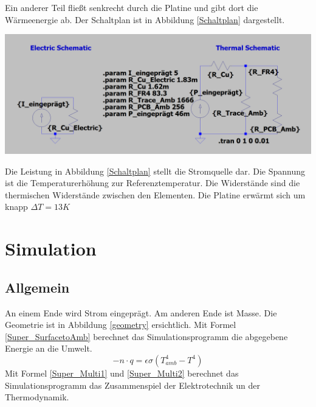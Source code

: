 \documentclass[10pt,a4paper,oneside,abstracton]{scrartcl}
\newenvironment{Figure}
  {\par\medskip\noindent\minipage{\linewidth}}
  {\endminipage\par\medskip}
\begin{document}
\begin{multicols}{2}
\newline
Ein anderer Teil fließt senkrecht durch die Platine und gibt dort die Wärmeenergie ab. 
Der Schaltplan ist in Abbildung \ref*{Schaltplan} dargestellt. 
\begin{Figure}
	\includegraphics[width=\textwidth]{Bilder/Schaltplan.png}
	\label{Schaltplan}
\end{Figure}
\noindent
Die Leistung in Abbildung \ref{Schaltplan} stellt die Stromquelle dar. 
Die Spannung ist die Temperaturerhöhung zur Referenztemperatur. 
Die Widerstände sind die thermischen Widerstände zwischen den Elementen. 
\newline
Die Platine erwärmt sich um knapp $\Delta T = 13K$


\section{Simulation}
\subsection{Allgemein}
An einem Ende wird Strom eingeprägt. Am anderen Ende ist Masse.
Die Geometrie ist in Abbildung \ref*{geometry} ersichtlich.
\newline
Mit Formel \ref*{Super_SurfacetoAmb} berechnet das Simulationsprogramm die abgegebene Energie an die Umwelt.
\begin{equation}
	-n \cdot q = \epsilon \sigma (T^4_{amb} - T^4)
	\label{Super_SurfacetoAmb}
	\end{equation}
	\noindent
	Mit Formel \ref*{Super_Multi1} und \ref*{Super_Multi2} berechnet das Simulationsprogramm das Zusammenspiel der Elektrotechnik un der Thermodynamik.


\end{multicols}
\end{document}
